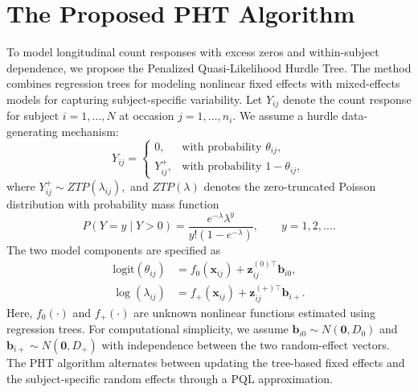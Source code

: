 \documentclass[twoside]{article}
\begin{document}
\section{The Proposed PHT Algorithm}\label{sec:pht}
To model longitudinal count responses with excess zeros and within-subject dependence, we propose the Penalized Quasi-Likelihood Hurdle Tree. The method combines regression trees for modeling nonlinear fixed effects with mixed-effects models for capturing subject-specific variability. Let $Y_{ij}$ denote the count response for subject $i=1,\ldots,N$ at occasion $j=1,\ldots,n_i$. We assume a hurdle data-generating mechanism:
\begin{equation*}
	Y_{ij}
	=
	\begin{cases}
		0, & \text{with probability } \theta_{ij},\\
		Y_{ij}^{+}, & \text{with probability } 1-\theta_{ij},
	\end{cases}
\end{equation*}
where
$
	Y_{ij}^{+}\sim ZTP(\lambda_{ij}),
$
and $ZTP(\lambda)$ denotes the zero-truncated Poisson distribution with probability mass function
\begin{equation*}
	P(Y=y \mid Y>0)
	=
	\frac{e^{-\lambda}\lambda^{y}}
	{y!\left(1-e^{-\lambda}\right)},
	\qquad y=1,2,\ldots   .
\end{equation*}
The two model components are specified as
\begin{align}
	\text{logit}(\theta_{ij})
	&=
	f_0(\mathbf{x}_{ij})
	+
	\mathbf{z}_{ij}^{(0)\top}\mathbf{b}_{i0},
	\\
	\log(\lambda_{ij})
	&=
	f_+(\mathbf{x}_{ij})
	+
	\mathbf{z}_{ij}^{(+)\top}\mathbf{b}_{i+}.
\end{align}
Here, $f_0(\cdot)$ and $f_+(\cdot)$ are unknown nonlinear functions estimated using regression trees. For computational simplicity, we assume
$
	\mathbf{b}_{i0}
	\sim
	N(\mathbf{0},D_0)$ and
	$\mathbf{b}_{i+}
	\sim
	N(\mathbf{0},D_+)$
with independence between the two random-effect vectors.
The PHT algorithm alternates between updating the tree-based fixed effects and the subject-specific random effects through a PQL approximation.
\end{document}
